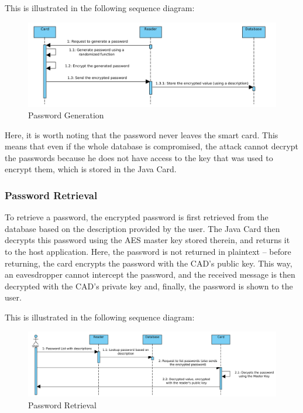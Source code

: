 \documentclass[a4paper, 11pt]{article}
\begin{document}
    This is illustrated in the following sequence diagram:

    \begin{figure}[H]
        \centering
        \includegraphics[width=\textwidth]{img/generation}
        \caption{Password Generation}
        \label{fig:generation}
    \end{figure}

    Here, it is worth noting that the password never leaves the smart card.
    This means that even if the whole database is compromised, the attack cannot decrypt the passwords because he does
    not have access to the key that was used to encrypt them, which is stored in the Java Card.

    \subsubsection{Password Retrieval}

    To retrieve a password, the encrypted password is first retrieved from the database based on the description provided
    by the user.
    The Java Card then decrypts this password using the AES master key stored therein, and returns it to the host
    application.
    Here, the password is not returned in plaintext -- before returning, the card encrypts the password with the CAD's
    public key.
    This way, an eavesdropper cannot intercept the password, and the received message is then decrypted with the CAD's
    private key and, finally, the password is shown to the user.

    This is illustrated in the following sequence diagram:

    \vspace{1.5\baselineskip}

    \begin{figure}[H]
        \centering
        \includegraphics[width=\textwidth]{img/retrtieve}
        \caption{Password Retrieval}
        \label{fig:retrieve}
    \end{figure}
\end{document}
